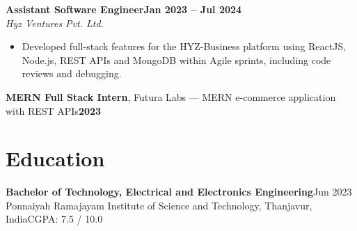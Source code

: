\documentclass[10pt,a4paper]{article}
\newcommand{\job}[3]{%
  \Needspace{5\baselineskip}%
  \textbf{#1}\hfill\textbf{#2}\\
  \textit{#3}\par\vspace{1pt}
}
\begin{document}
\vspace{2pt}
\job{Assistant Software Engineer}{Jan 2023 -- Jul 2024}{Hyz Ventures Pvt. Ltd.}
\begin{itemize}
  \item Developed full-stack features for the HYZ-Business platform using ReactJS, Node.js, REST APIs and MongoDB within Agile sprints, including code reviews and debugging.
\end{itemize}

\vspace{2pt}
\textbf{MERN Full Stack Intern}, Futura Labs --- MERN e-commerce application with REST APIs\hfill\textbf{2023}

\section*{Education}
\textbf{Bachelor of Technology, Electrical and Electronics Engineering}\hfill Jun 2023\\
Ponnaiyah Ramajayam Institute of Science and Technology, Thanjavur, India\hfill CGPA: 7.5 / 10.0
\end{document}
